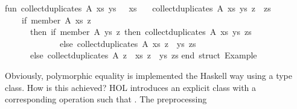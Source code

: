 \begin{isabellebody}
\begin{isamarkuptext}
\isanewline
fun\ collect{}duplicates\ A{}\ xs\ ys\ {}{}\ {}\ xs\isanewline
\ \ {}\ collect{}duplicates\ A{}\ xs\ ys\ {}z\ {}{}\ zs{}\ {}\isanewline
\ \ \ \ {}if\ member\ A{}\ xs\ z\isanewline
\ \ \ \ \ \ then\ {}if\ member\ A{}\ ys\ z\ then\ collect{}duplicates\ A{}\ xs\ ys\ zs\isanewline
\ \ \ \ \ \ \ \ \ \ \ \ \ else\ collect{}duplicates\ A{}\ xs\ {}z\ {}{}\ ys{}\ zs{}\isanewline
\ \ \ \ \ \ else\ collect{}duplicates\ A{}\ {}z\ {}{}\ xs{}\ {}z\ {}{}\ ys{}\ zs{}{}\isanewline
\isanewline
end{}\ {}{}struct\ Example{}{}\isanewline%
\end{isamarkuptext}%
\isamarkuptrue%
%
\endisatagquotetypewriter
{\isafoldquotetypewriter}%
%
\isadelimquotetypewriter
%
\endisadelimquotetypewriter
%
\begin{isamarkuptext}%
\noindent Obviously, polymorphic equality is implemented the Haskell
  way using a type class.  How is this achieved?  HOL introduces an
  explicit class  with a corresponding operation  such that .  The preprocessing

\end{isamarkuptext}
\end{isabellebody}
